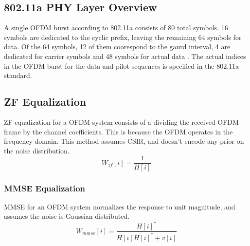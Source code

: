 \documentclass[conference]{IEEEtran}
\begin{document}
\subsection{802.11a PHY Layer Overview}
A single OFDM burst according to 802.11a consists of 80 total symbols. 16 symbols are dedicated to the cyclic prefix, leaving the remaining 64 symbols for data. Of the 64 symbols, 12 of them coorespond to the gaurd interval, 4 are dedicated for carrier symbols and 48 symbols for actual data \cite{goldsmith}. The actual indices in the OFDM burst for the data and pilot sequences is specified in the 802.11a standard. 

\subsection{ZF Equalization}
ZF equalization for a OFDM system consists of a dividing the received OFDM frame by the channel coefficients. This is because the OFDM operates in the frequency domain. This method assumes CSIR, and doesn't encode any prior on the noise distribution.
\begin{equation}
W_{zf}[i] = \frac{1}{H[i]}
\end{equation}

\subsubsection{MMSE Equalization}
MMSE for an OFDM system normalizes the response to unit magnitude, and assumes the noise is Gaussian distributed. 
\begin{equation}
W_{mmse}[i] = \frac{H[i]^*}{H[i]H[i]^* + v[i]}
\end{equation}
\end{document}

